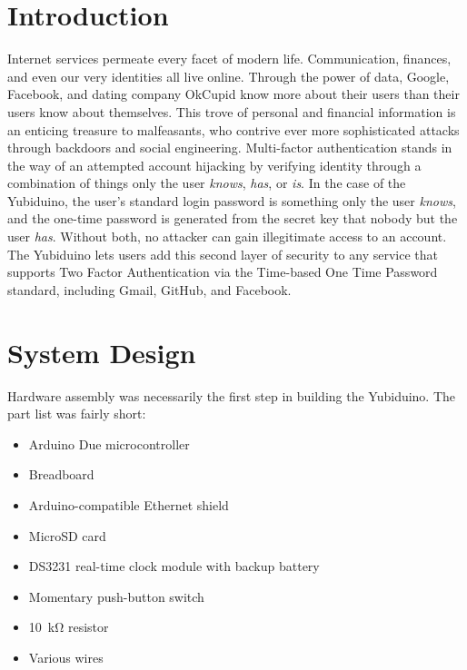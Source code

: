 \documentclass[conference]{IEEEtran}
\begin{document}




%
\IEEEpeerreviewmaketitle



\section{Introduction}
Internet services permeate every facet of modern life. Communication, finances, and even our very identities all live online. Through the power of data, Google, Facebook, and dating company OkCupid know more about their users than their users know about themselves. This trove of personal and financial information is an enticing treasure to malfeasants, who contrive ever more sophisticated attacks through backdoors and social engineering. Multi-factor authentication stands in the way of an attempted account hijacking by verifying identity through a combination of things only the user \textit{knows}, \textit{has}, or \textit{is}. In the case of the Yubiduino, the user's standard login password is something only the user \textit{knows}, and the one-time password is generated from the secret key that nobody but the user \textit{has}. Without both, no attacker can gain illegitimate access to an account. The Yubiduino lets users add this second layer of security to any service that supports Two Factor Authentication via the Time-based One Time Password standard, including Gmail, GitHub, and Facebook.


\section{System Design}
Hardware assembly was necessarily the first step in building the Yubiduino. The part list was fairly short:

\begin{itemize}
  \item Arduino Due microcontroller
  \item Breadboard
  \item Arduino-compatible Ethernet shield
  \item MicroSD card
  \item DS3231 real-time clock module with backup battery
  \item Momentary push-button switch
  \item \SI{10}{\kohm} resistor
  \item Various wires
\end{itemize}
\end{document}

